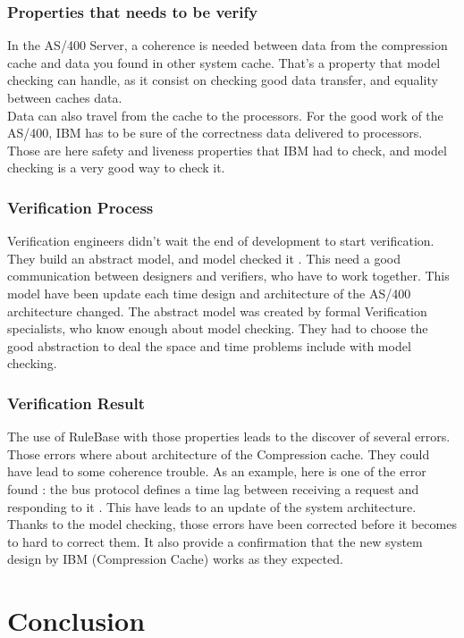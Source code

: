 \documentclass[a4paper,12pt]{article} %
\begin{document}
\subsubsection{Properties that needs to be verify}
In the AS/400 Server, a coherence is needed between data from the compression cache and data you found in other system cache. That's a property that model checking can handle, as it consist on checking good data transfer, and equality between caches data.\\
Data can also travel from the cache to the processors. For the good work of the AS/400, IBM has to be sure of the correctness data delivered to processors.
Those are here safety and liveness properties that IBM had to check, and model checking is a very good way to check it.
\subsubsection{Verification Process}
Verification engineers didn't wait the end of development to start verification. They build an abstract model, and model checked it . This need a good communication between designers and verifiers, who have to work together. This model have been update each time design and architecture of the AS/400 architecture changed. The abstract model was created by formal Verification specialists, who know enough about model checking. They had to choose the good abstraction to deal the space and time problems include with model checking.
\subsubsection{Verification Result}
The use of RuleBase with those properties leads to the discover of several errors. Those errors where about architecture of the Compression cache. They could have lead to some coherence trouble. As an example, here is one of the error found : the bus protocol defines a time lag between receiving a request and responding to it \cite{YaelAbarbanel-Vinov}. This have leads to an update of the system architecture. Thanks to the model checking, those errors have been corrected before it becomes to hard to correct them. It also provide a confirmation that the new system design by IBM (Compression Cache) works as they expected. 

\section*{Conclusion}
\end{document}
